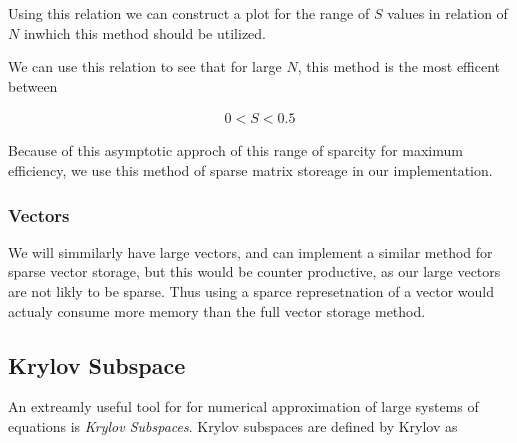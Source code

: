 \documentclass[../fem.tex]{subfiles}
\begin{document}
Using this relation we can construct a plot for the range of $S$ values in
relation of $N$ inwhich this method should be utilized.


We can use this relation to see that for large $N$, this method is the most
efficent between

\begin{align*}
  0 < S < 0.5
\end{align*}

Because of this asymptotic approch of this range of sparcity for maximum
efficiency, we use this method of sparse matrix storeage in our implementation.

\begin{Figure}
  \begin{center}
  \end{center}
  \label{fig:mat_CRS}
\end{Figure}

\subsubsection{Vectors}%
\label{ssub:vectors}

We will simmilarly have large vectors, and can implement a similar method for
sparse vector storage, but this would be counter productive, as our large
vectors are not likly to be sparse. Thus using a sparce represetnation of a
vector would actualy consume more memory than the full vector storage method.

\subsection{Krylov Subspace}%
\label{sub:krylov_subspace}

An extreamly useful tool for for numerical approximation of large systems of
equations is \textit{Krylov Subspaces}. Krylov subspaces are defined by
Krylov\cite{KRYLOV} as
\end{document}
